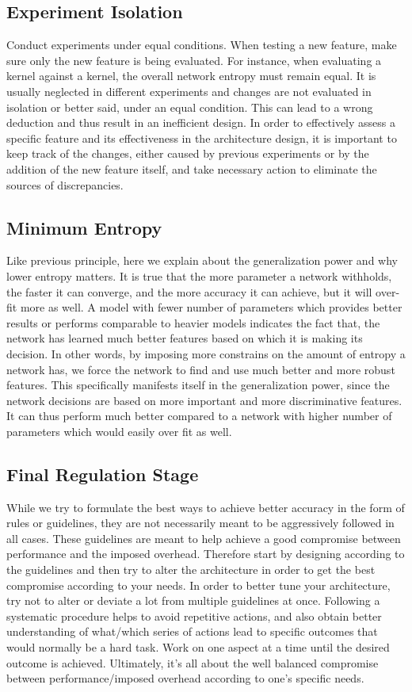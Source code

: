 \documentclass{article} \usepackage{lets_keepit_simple,times}
\begin{document}
\subsection{Experiment Isolation}
Conduct experiments under equal conditions. When testing a new feature, make sure only the new feature is being evaluated. For instance, when evaluating a  kernel against a  kernel, the overall network entropy must remain equal. It is usually neglected in different experiments and changes are not evaluated in isolation or better said, under an equal condition. This can lead to a wrong deduction and thus result in an inefficient design. In order to effectively assess a specific feature and its effectiveness in the architecture design, it is important to keep track of the changes, either caused by previous experiments or by the addition of the new feature itself, and take necessary action to eliminate the sources of discrepancies. 
\subsection{Minimum Entropy}
Like previous principle, here we explain about the generalization power and why lower entropy matters. It is true that the more parameter a network withholds, the faster it can converge, and the more accuracy it can achieve, but it will over-fit more as well. A model with fewer number of parameters which provides better results or performs comparable to heavier models indicates the fact that, the network has learned much better features based on which it is making its decision. In other words, by imposing more constrains on the amount of entropy a network has, we force the network to find and use much better and more robust features. This specifically manifests itself in the generalization power, since the network decisions are based on more important and more discriminative features. It can thus perform much better compared to a network with higher number of parameters which would easily over fit as well.    
\subsection{Final Regulation Stage}
While we try to formulate the best ways to achieve better accuracy in the form of rules or guidelines, they are not necessarily meant to be aggressively followed in all cases. These guidelines are meant to help achieve a good compromise between performance and the imposed overhead. Therefore start by designing according to the guidelines and then try to alter the architecture in order to get the best compromise according to your needs. In order to better tune your architecture, try not to alter or deviate a lot from multiple guidelines at once. Following a systematic procedure helps to avoid repetitive actions, and also obtain better understanding of what/which series of actions lead to specific outcomes that would normally be a hard task. Work on one aspect at a time until the desired outcome is achieved. Ultimately, it's all about the well balanced compromise between performance/imposed overhead according to one's specific needs.\\
\end{document}
